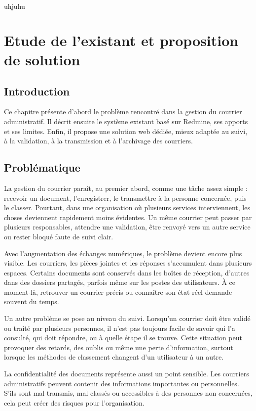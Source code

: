 \documentclass[12pt,a4paper]{report}
\begin{document}

\tableofcontents
uhjuhu
\newpage
\listoffigures
\newpage


\chapter{Etude de l'existant et proposition de solution}

\section*{Introduction}

Ce chapitre présente d'abord le problème rencontré dans la gestion du courrier administratif. Il décrit ensuite le système existant basé sur Redmine, ses apports et ses limites. Enfin, il propose une solution web dédiée, mieux adaptée au suivi, à la validation, à la transmission et à l'archivage des courriers.
\section{Problématique}
\label{sec:problematique}

La gestion du courrier paraît, au premier abord, comme une tâche assez simple : recevoir un document, l’enregistrer, le transmettre à la personne concernée, puis le classer. Pourtant, dans une organisation où plusieurs services interviennent, les choses deviennent rapidement moins évidentes. Un même courrier peut passer par plusieurs responsables, attendre une validation, être renvoyé vers un autre service ou rester bloqué faute de suivi clair.

Avec l’augmentation des échanges numériques, le problème devient encore plus visible. Les courriers, les pièces jointes et les réponses s’accumulent dans plusieurs espaces. Certains documents sont conservés dans les boîtes de réception, d’autres dans des dossiers partagés, parfois même sur les postes des utilisateurs. À ce moment-là, retrouver un courrier précis ou connaître son état réel demande souvent du temps.

Un autre problème se pose au niveau du suivi. Lorsqu’un courrier doit être validé ou traité par plusieurs personnes, il n’est pas toujours facile de savoir qui l’a consulté, qui doit répondre, ou à quelle étape il se trouve. Cette situation peut provoquer des retards, des oublis ou même une perte d’information, surtout lorsque les méthodes de classement changent d’un utilisateur à un autre.

La confidentialité des documents représente aussi un point sensible. Les courriers administratifs peuvent contenir des informations importantes ou personnelles. S’ils sont mal transmis, mal classés ou accessibles à des personnes non concernées, cela peut créer des risques pour l’organisation.
\end{document}

